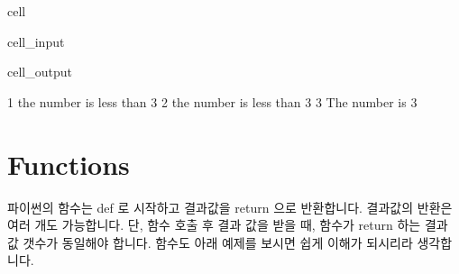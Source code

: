 \documentclass[letterpaper,10pt,english]{jupyterBook}
\begin{document}
\begin{sphinxuseclass}{cell}\begin{sphinxVerbatimInput}

\begin{sphinxuseclass}{cell_input}
\begin{sphinxVerbatim}[commandchars=\\\{\}]
   
       
         
       
          
         
\end{sphinxVerbatim}

\end{sphinxuseclass}\end{sphinxVerbatimInput}
\begin{sphinxVerbatimOutput}

\begin{sphinxuseclass}{cell_output}
\begin{sphinxVerbatim}[commandchars=\\\{\}]
1 the number is less than 3
2 the number is less than 3
3 The number is 3
\end{sphinxVerbatim}

\end{sphinxuseclass}\end{sphinxVerbatimOutput}

\end{sphinxuseclass}

\section{Functions}
\label{\detokenize{chapter2/2.1.5_Python_Basics:functions}}\label{\detokenize{chapter2/2.1.5_Python_Basics::doc}}
\sphinxAtStartPar
파이썬의 함수는 def 로 시작하고 결과값을 return 으로 반환합니다. 결과값의 반환은 여러 개도 가능합니다. 단, 함수 호출 후 결과 값을 받을 때, 함수가 return 하는 결과 값 갯수가 동일해야 합니다. 함수도 아래 예제를 보시면 쉽게 이해가 되시리라 생각합니다.
\end{document}
